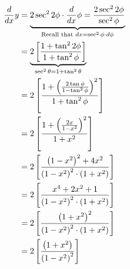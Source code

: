 \documentclass[14pt,fleqn]{extarticle}
\begin{document}
\begin{question}
\begin{step}
     \begin{align}
	\frac{d}{dx} y &= \underbrace{2 \sec^2 2\phi \cdot \frac{d}{dx} \phi = \frac{2\sec^2 2\phi}{\sec^2\phi}}_{\text{Recall that } dx = \sec^2\phi\cdot d\phi}  \\
	&= \underbrace{2 \left[\dfrac{1 + \tan^2 2\phi}{1+\tan^2\phi} \right]}_{\sec^2\theta = 1 + \tan^2\theta} \\
	&= 2 \left[\dfrac{1 + \left(\frac{2\tan\phi}{1-\tan^2\phi} \right)^2}{1 + \tan^2\phi} \right] \\
	&= 2 \left[\dfrac{1 + \left(\frac{2x}{1-x^2} \right)^2}{1+x^2} \right] \\
	&= 2 \left[\dfrac{\left(1-x^2 \right)^2 + 4x^2}{\left(1-x^2 \right)^2\cdot \left(1+x^2 \right)} \right] \\
	&= 2 \left[\dfrac{x^4 + 2x^2 + 1}{\left(1-x^2 \right)^2\cdot \left(1+x^2 \right)} \right] \\
	&= 2 \left[\dfrac{\left(1+x^2 \right)^2}{\left(1-x^2 \right)^2\cdot \left(1+x^2 \right)} \right] \\
	&= 2 \left[\dfrac{\left(1+x^2 \right)}{\left(1-x^2 \right)^2} \right]
\end{align} 
\end{step}
\end{question} 
\end{document}
